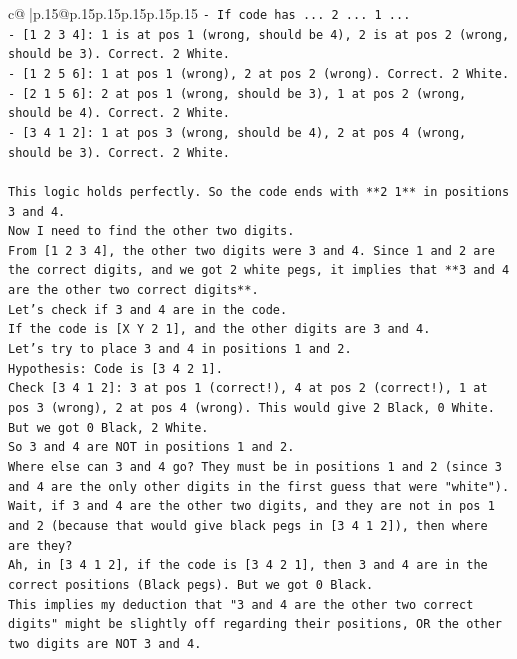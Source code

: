 \documentclass{article}
\begin{document}
{\begin{supertabular}{c@{$\;$}|p{.15\linewidth}@{}p{.15\linewidth}p{.15\linewidth}p{.15\linewidth}p{.15\linewidth}p{.15\linewidth}}
{{{\texttt{{-} If code has ... 2 ... 1 ...} \\
\texttt{{-} {[}1 2 3 4{]}: 1 is at pos 1 (wrong, should be 4), 2 is at pos 2 (wrong, should be 3). Correct. 2 White.} \\
\texttt{{-} {[}1 2 5 6{]}: 1 at pos 1 (wrong), 2 at pos 2 (wrong). Correct. 2 White.} \\
\texttt{{-} {[}2 1 5 6{]}: 2 at pos 1 (wrong, should be 3), 1 at pos 2 (wrong, should be 4). Correct. 2 White.} \\
\texttt{{-} {[}3 4 1 2{]}: 1 at pos 3 (wrong, should be 4), 2 at pos 4 (wrong, should be 3). Correct. 2 White.} \\
\\ 
\texttt{This logic holds perfectly. So the code ends with **2 1** in positions 3 and 4.} \\
\texttt{Now I need to find the other two digits.} \\
\texttt{From {[}1 2 3 4{]}, the other two digits were 3 and 4. Since 1 and 2 are the correct digits, and we got 2 white pegs, it implies that **3 and 4 are the other two correct digits**.} \\
\texttt{Let's check if 3 and 4 are in the code.} \\
\texttt{If the code is {[}X Y 2 1{]}, and the other digits are 3 and 4.} \\
\texttt{Let's try to place 3 and 4 in positions 1 and 2.} \\
\texttt{Hypothesis: Code is {[}3 4 2 1{]}.} \\
\texttt{Check {[}3 4 1 2{]}: 3 at pos 1 (correct!), 4 at pos 2 (correct!), 1 at pos 3 (wrong), 2 at pos 4 (wrong). This would give 2 Black, 0 White. But we got 0 Black, 2 White.} \\
\texttt{So 3 and 4 are NOT in positions 1 and 2.} \\
\texttt{Where else can 3 and 4 go? They must be in positions 1 and 2 (since 3 and 4 are the only other digits in the first guess that were "white").} \\
\texttt{Wait, if 3 and 4 are the other two digits, and they are not in pos 1 and 2 (because that would give black pegs in {[}3 4 1 2{]}), then where are they?} \\
\texttt{Ah, in {[}3 4 1 2{]}, if the code is {[}3 4 2 1{]}, then 3 and 4 are in the correct positions (Black pegs). But we got 0 Black.} \\
\texttt{This implies my deduction that "3 and 4 are the other two correct digits" might be slightly off regarding their positions, OR the other two digits are NOT 3 and 4.} \\
}}}
\end{supertabular}}
\end{document}
